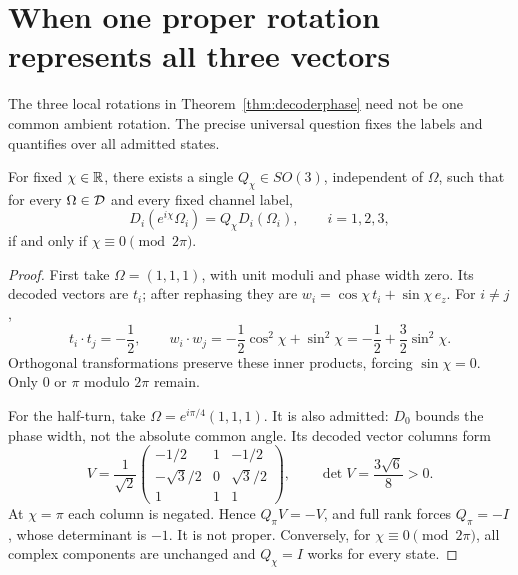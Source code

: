 \section{When one proper rotation represents all three vectors}\label{sec:rotation}

The three local rotations in Theorem~\ref{thm:decoderphase} need not be one common ambient rotation. The precise universal question fixes the labels and quantifies over all admitted states.

\begin{theorem}\label{thm:universalrotation}
For fixed \(\chi\in\mathbb R\), there exists a single \(Q_\chi\in SO(3)\), independent of \(\Omega\), such that for every \(\Omega\in\mathcal D\) and every fixed channel label,
\begin{equation}
D_i(e^{i\chi}\Omega_i)=Q_\chi D_i(\Omega_i),\qquad i=1,2,3,
\label{eq:universalquestion}
\end{equation}
if and only if \(\chi\equiv0\pmod{2\pi}\).
\end{theorem}
\begin{proof}
First take \(\Omega=(1,1,1)\), with unit moduli and phase width zero. Its decoded vectors are \(t_i\); after rephasing they are \(w_i=\cos\chi\,t_i+\sin\chi\,e_z\). For \(i\ne j\),
\begin{equation}
t_i\cdot t_j=-\frac12,\qquad
w_i\cdot w_j=-\frac12\cos^2\chi+\sin^2\chi
=-\frac12+\frac32\sin^2\chi.
\label{eq:gramwitness}
\end{equation}
Orthogonal transformations preserve these inner products, forcing \(\sin\chi=0\). Only \(0\) or \(\pi\) modulo \(2\pi\) remain.

For the half-turn, take \(\Omega=e^{i\pi/4}(1,1,1)\). It is also admitted: \(D_0\) bounds the phase width, not the absolute common angle. Its decoded vector columns form
\begin{equation}
V=\frac1{\sqrt2}
\begin{pmatrix}-1/2&1&-1/2\\-\sqrt3/2&0&\sqrt3/2\\1&1&1\end{pmatrix},
\qquad \det V=\frac{3\sqrt6}{8}>0.
\label{eq:volumewitness}
\end{equation}
At \(\chi=\pi\) each column is negated. Hence \(Q_\pi V=-V\), and full rank forces \(Q_\pi=-I\), whose determinant is \(-1\). It is not proper. Conversely, for \(\chi\equiv0\pmod{2\pi}\), all complex components are unchanged and \(Q_\chi=I\) works for every state.
\end{proof}

